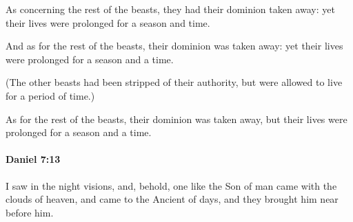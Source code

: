 			As concerning the rest of the beasts, they had their dominion taken away: yet their lives were prolonged for a season and time.

			\begin{versebox}
					\item[BHS] 
					\item[LXX] 
					\item[ASV] And as for the rest of the beasts, their dominion was taken away: yet their lives were prolonged for a season and a time.
					\item[NIV] (The other beasts had been stripped of their authority, but were allowed to live for a period of time.)
					\item[NRSV] As for the rest of the beasts, their dominion was taken away, but their lives were prolonged for a season and a time.
			\end{versebox}

		\paragraph{Daniel 7:13} %
			\label{DANIEL-7-13}

			I saw in the night visions, and, behold, one like the Son of man came with the clouds of heaven, and came to the Ancient of days, and they brought him near before him.

